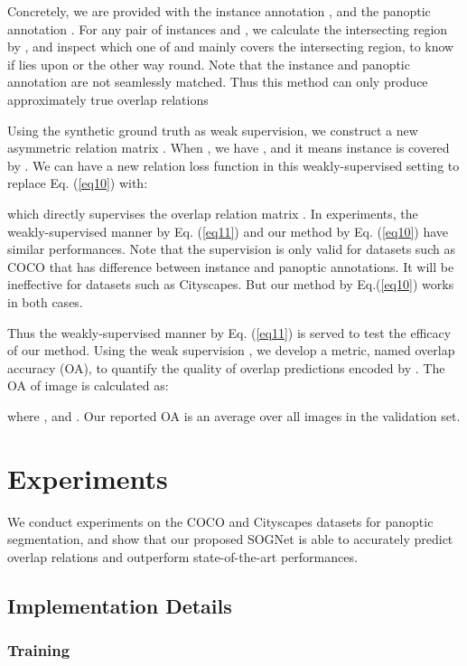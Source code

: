 \documentclass[letterpaper]{article} \usepackage{aaai20}  \usepackage{times}  \usepackage{helvet} \usepackage{courier}  \usepackage[hyphens]{url}  \usepackage{graphicx} \urlstyle{rm} \def\UrlFont{\rm}  \usepackage{graphicx}  \frenchspacing  \setlength{\pdfpagewidth}{8.5in}  \setlength{\pdfpageheight}{11in}
\begin{document}
Concretely, we are provided with the instance annotation  , and the panoptic annotation . For any pair of instances  and , we calculate the intersecting region by , and inspect which one of  and  mainly covers the intersecting region, to know if  lies upon  or the other way round. Note that the instance and panoptic annotation are not seamlessly matched. Thus this method can only produce approximately true overlap relations

Using the synthetic ground truth as weak supervision, we construct a new asymmetric relation matrix . When , we have , and it means instance  is covered by . We can have a new relation loss function in this weakly-supervised setting to replace Eq. (\ref{eq10}) with:

which directly supervises the overlap relation matrix . In experiments, the weakly-supervised manner by Eq. (\ref{eq11}) and our method by Eq. (\ref{eq10}) have similar performances. Note that the supervision is only valid for datasets such as COCO that has difference between instance and panoptic annotations. It will be ineffective for datasets such as Cityscapes. But our method by Eq.(\ref{eq10}) works in both cases. 

Thus the weakly-supervised manner by Eq. (\ref{eq11}) is served to test the efficacy of our method. Using the weak supervision , we develop a metric, named overlap accuracy (OA), to quantify the quality of overlap predictions encoded by . The OA of image  is calculated as:

where , and . Our reported OA is an average over all images in the validation set. 

\section{Experiments}


We conduct experiments on the COCO and Cityscapes datasets for panoptic segmentation, and show that our proposed SOGNet is able to accurately predict overlap relations and outperform state-of-the-art performances.



\subsection{Implementation Details}

\subsubsection{Training}
\end{document}

